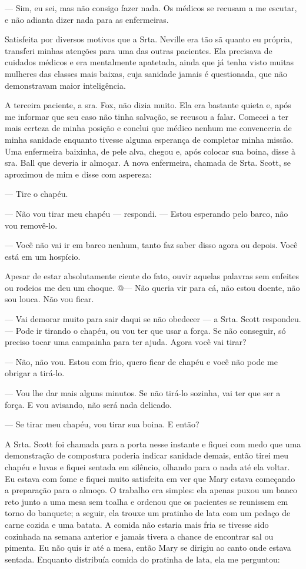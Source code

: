 --- Sim, eu sei, mas não consigo fazer nada. Os médicos se recusam a me
escutar, e não adianta dizer nada para as enfermeiras.

Satisfeita por diversos motivos que a Srta. Neville era tão sã quanto eu
própria, transferi minhas atenções para uma das outras pacientes. Ela
precisava de cuidados médicos e era mentalmente apatetada, ainda que já
tenha visto muitas mulheres das classes mais baixas, cuja sanidade
jamais é questionada, que não demonstravam maior inteligência.

A terceira paciente, a sra. Fox, não dizia muito. Ela era bastante
quieta e, após me informar que seu caso não tinha salvação, se recusou a
falar. Comecei a ter mais certeza de minha posição e conclui que médico
nenhum me convenceria de minha sanidade enquanto tivesse alguma
esperança de completar minha missão. Uma enfermeira baixinha, de pele
alva, chegou e, após colocar sua boina, disse à sra. Ball que deveria ir
almoçar. A nova enfermeira, chamada de Srta. Scott, se aproximou de mim
e disse com aspereza:

--- Tire o chapéu.

--- Não vou tirar meu chapéu --- respondi. --- Estou esperando pelo
barco, não vou removê-lo.

--- Você não vai ir em barco nenhum, tanto faz saber disso agora ou
depois. Você está em um hospício.

Apesar de estar absolutamente ciente do fato, ouvir aquelas palavras sem
enfeites ou rodeios me deu um choque. @--- Não queria vir para cá, não
estou doente, não sou louca. Não vou ficar.

--- Vai demorar muito para sair daqui se não obedecer --- a Srta. Scott
respondeu. --- Pode ir tirando o chapéu, ou vou ter que usar a força. Se
não conseguir, só preciso tocar uma campainha para ter ajuda. Agora você
vai tirar?

--- Não, não vou. Estou com frio, quero ficar de chapéu e você não pode
me obrigar a tirá-lo.

--- Vou lhe dar mais alguns minutos. Se não tirá-lo sozinha, vai ter que
ser a força. E vou avisando, não será nada delicado.

--- Se tirar meu chapéu, vou tirar sua boina. E então?

A Srta. Scott foi chamada para a porta nesse instante e fiquei com medo
que uma demonstração de compostura poderia indicar sanidade demais,
então tirei meu chapéu e luvas e fiquei sentada em silêncio, olhando
para o nada até ela voltar. Eu estava com fome e fiquei muito satisfeita
em ver que Mary estava começando a preparação para o almoço. O trabalho
era simples: ela apenas puxou um banco reto junto a uma mesa sem toalha
e ordenou que os pacientes se reunissem em torno do banquete; a seguir,
ela trouxe um pratinho de lata com um pedaço de carne cozida e uma
batata. A comida não estaria mais fria se tivesse sido cozinhada na
semana anterior e jamais tivera a chance de encontrar sal ou pimenta. Eu
não quis ir até a mesa, então Mary se dirigiu ao canto onde estava
sentada. Enquanto distribuía comida do pratinha de lata, ela me
perguntou:


